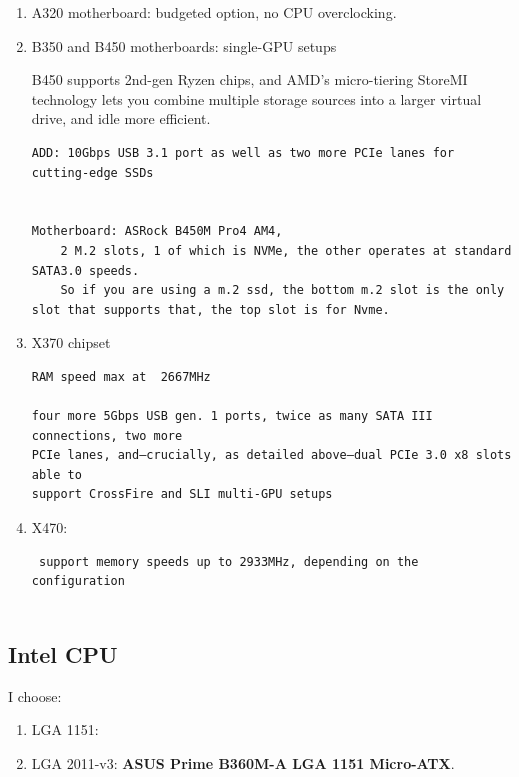 \begin{enumerate}
  \item  A320 motherboard: budgeted option, no CPU overclocking.
  
  \item B350 and B450 motherboards: single-GPU setups
  
  B450 supports  2nd-gen Ryzen chips, and  AMD’s micro-tiering StoreMI
  technology lets you combine multiple storage sources into a larger virtual
  drive, and idle more efficient.
  
\begin{verbatim}
ADD: 10Gbps USB 3.1 port as well as two more PCIe lanes for cutting-edge SSDs


Motherboard: ASRock B450M Pro4 AM4, 
	2 M.2 slots, 1 of which is NVMe, the other operates at standard SATA3.0 speeds.
	So if you are using a m.2 ssd, the bottom m.2 slot is the only slot that supports that, the top slot is for Nvme.
\end{verbatim}

  \item  X370 chipset

\begin{verbatim}
RAM speed max at  2667MHz

four more 5Gbps USB gen. 1 ports, twice as many SATA III connections, two more
PCIe lanes, and—crucially, as detailed above—dual PCIe 3.0 x8 slots able to
support CrossFire and SLI multi-GPU setups
\end{verbatim}  

  \item X470: 
  
\begin{verbatim}
 support memory speeds up to 2933MHz, depending on the configuration
 
\end{verbatim}
\end{enumerate}


\subsection{Intel CPU}

I choose: 

\begin{enumerate}
  \item LGA 1151:
  
  \item LGA 2011-v3: {\bf ASUS Prime B360M-A LGA 1151 Micro-ATX}.
   
\end{enumerate}

